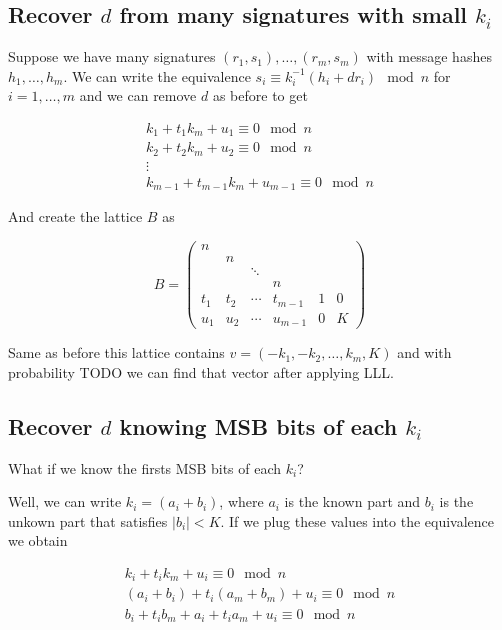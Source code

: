 \documentclass[a4paper,12pt]{report}
\begin{document}
\subsection{Recover $d$ from many signatures with small $k_i$}

Suppose we have many signatures $(r_1, s_1), \ldots, (r_m, s_m)$ with message hashes $h_1, \ldots, h_m$. We can write the equivalence
$s_i \equiv k_i^{-1}(h_i +  dr_i) \mod n$ for $i = 1,\ldots,m$ and we can remove $d$ as before to get

\[
\begin{array}{c}
    k_1 + t_1k_m + u_1 \equiv 0 \mod n \\
    k_2 + t_2k_m + u_2 \equiv 0 \mod n \\
    \vdots \\
    k_{m-1} + t_{m-1}k_m + u_{m-1} \equiv 0 \mod n
\end{array}
\]

\vspace*{10px}

And create the lattice $B$ as

\[
    B = 
    \begin{pmatrix}
     n &  \\
     & n \\
     & & \ddots \\
     & & & n \\
     t_1 & t_2 & \cdots & t_{m-1} & 1 & 0 \\
     u_1 & u_2 & \cdots & u_{m-1} & 0 & K
     \label{eq:lattice_ecdsa}
    \end{pmatrix}
\]

\vspace*{10px}

Same as before this lattice contains $v = (-k_1, -k_2, \ldots, k_m, K)$ and with probability TODO we can find that vector after applying LLL.

\subsection{Recover $d$ knowing MSB bits of each $k_i$}

What if we know the firsts MSB bits of each $k_i$?

Well, we can write $k_i = (a_i + b_i)$, where $a_i$ is the known part and $b_i$ is the unkown part that satisfies $|b_i| < K$. If we plug these values
into the equivalence we obtain

\[
    \begin{array}{c}
        k_i + t_ik_m + u_i \equiv 0 \mod n \\
        (a_i + b_i) + t_i(a_m + b_m) + u_i \equiv 0 \mod n \\
        b_i + t_ib_m + a_i + t_ia_m + u_i \equiv 0 \mod n \\
    \end{array}
\]
\end{document}
